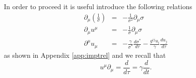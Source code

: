 \documentclass[aps,article]{revtex4}
\begin{document}
In order to proceed it is useful introduce the following relations
\begin{eqnarray}
\partial_{\mu}\left(\frac{1}{\sigma}\right)&=&-\frac{1}{\sigma^2}\partial_{\mu}\sigma\label{eqn:sigrel}\\
\partial_{\mu}u^{\mu}&=&-\frac{1}{\sigma}\partial_{\mu}\sigma\label{eqn:sigrel2}\\
\partial^{\mu}u_{\mu}&=&-\frac{\gamma}{\sigma^*}\frac{d\sigma^*}{d\tau}-\frac{g^{ij}u_i}{\gamma}\frac{du_j}{d\tau}\label{eqn:sigrel3}
\end{eqnarray}
as shown in Appendix \ref{app:imptrel}
and we recall that 
\begin{equation}\label{eqn:dervs}
u^{\mu}\partial_{\mu}=\frac{d}{d\tau}=\gamma\frac{d}{dt}.
\end{equation}
\end{document}
